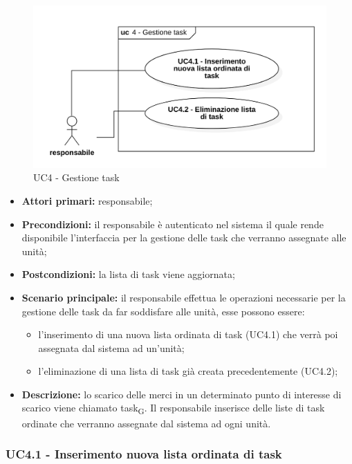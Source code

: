 \begin{figure}[H]
	\centering
	\includegraphics[scale=0.52]{res/images/uc4.png}
	\caption{UC4 - Gestione task}
\end{figure}

\begin{itemize}
	\item 	\textbf{Attori primari:} responsabile;
	\item 	\textbf{Precondizioni:} il responsabile è autenticato nel sistema il quale rende disponibile l'interfaccia per la gestione delle task che verranno assegnate alle unità;
	\item 	\textbf{Postcondizioni:} la lista di task viene aggiornata;
	\item 	\textbf{Scenario principale:} il responsabile effettua le operazioni necessarie per la gestione delle task da far soddisfare alle unità, esse possono essere:
	\begin{itemize}
		\item l'inserimento di una nuova lista ordinata di task (UC4.1) che verrà poi assegnata dal sistema ad un'unità;
		\item l'eliminazione di una lista di task già creata precedentemente (UC4.2);
	\end{itemize}
	\item 	\textbf{Descrizione:} lo scarico delle merci in un determinato punto di interesse di scarico viene chiamato task\textsubscript{G}. Il responsabile inserisce delle liste di task ordinate che verranno assegnate dal sistema ad ogni unità. 

\end{itemize}

\subsubsection{UC4.1 - Inserimento nuova lista ordinata di task}

